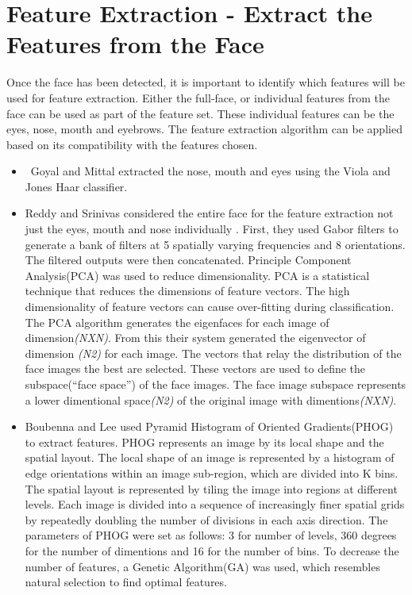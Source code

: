 \section{Feature Extraction - Extract the Features from the Face }
Once the face has been detected, it is important to identify which features will be used for feature extraction. Either the full-face, or individual features from the face can be used as part of the feature set. These individual features can be the eyes, nose, mouth and eyebrows. The feature extraction algorithm can be applied based on its compatibility with the features chosen. 
\begin{itemize}
\item\ Goyal and Mittal extracted the nose, mouth and eyes using the Viola and Jones Haar classifier\cite{1}.

\item Reddy and Srinivas considered the entire face for the feature extraction not just the eyes, mouth and nose individually . First, they used Gabor filters to generate a bank of filters at 5 spatially varying frequencies and 8 orientations. The filtered outputs were then concatenated. Principle Component Analysis(PCA) was used to reduce dimensionality. PCA is a statistical technique that reduces the dimensions of feature vectors. The high dimensionality of feature vectors can cause over-fitting during classification. The PCA algorithm generates the eigenfaces for each image of dimension\textit{(NXN)}. From this their system generated the eigenvector of dimension \textit{(N2)} for each image. The vectors that relay the distribution of the face images the best are selected. These vectors are used to define the subspace(“face space”) of the face images\cite{2}. The face image subspace represents a lower dimentional space\textit{(N2)} of the original image with dimentions\textit{(NXN)}.

\item Boubenna and Lee used Pyramid Histogram of Oriented Gradients(PHOG) to extract features. PHOG represents an image by its local shape and the spatial layout. The local shape of an image is represented by a histogram of edge orientations within an image sub-region, which are divided into K bins. The spatial layout is represented by tiling the image into regions at different levels. Each image is divided into a sequence of increasingly finer spatial grids by repeatedly doubling the number of divisions in each axis direction\cite{phog}. The parameters of PHOG were set as follows: 3 for number of levels, 360 degrees for the number of dimentions and 16 for the number of bins. To decrease the number of features, a Genetic Algorithm(GA) was used, which resembles natural selection to find optimal features\cite{3}.
\end{itemize}

